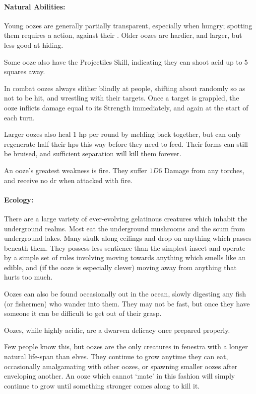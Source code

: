 \begin{multicols}{2}
\paragraph{Natural Abilities:} Young oozes are generally partially transparent, especially when hungry; spotting them requires a  action, against their .
Older oozes are hardier, and larger, but less good at hiding.

Some ooze also have the Projectiles Skill, indicating they can shoot acid up to 5 squares away.

In combat oozes always slither blindly at people, shifting about randomly so as not to be hit, and wrestling with their targets.
Once a target is grappled, the ooze inflicts damage equal to its Strength immediately, and again at the start of each turn.

Larger oozes also heal 1 \gls{hp} per round by melding back together, but can only regenerate half their \glspl{hp} this way before they need to feed.
Their forms can still be bruised, and sufficient separation will kill them forever.

An ooze's greatest weakness is fire.
They suffer $1D6$ Damage from any torches, and receive no \gls{dr} when attacked with fire.

\paragraph{Ecology:} There are a large variety of ever-evolving gelatinous creatures which inhabit the underground realms.
Most eat the underground mushrooms and the scum from underground lakes.
Many skulk along ceilings and drop on anything which passes beneath them.
They possess less sentience than the simplest insect and operate by a simple set of rules involving moving towards anything which smells like an edible, and (if the ooze is especially clever) moving away from anything that hurts too much.

Oozes can also be found occasionally out in the ocean, slowly digesting any fish (or fishermen) who wander into them.
They may not be fast, but once they have someone it can be difficult to get out of their grasp.

Oozes, while highly acidic, are a dwarven delicacy once prepared properly.

Few people know this, but oozes are the only creatures in \gls{fenestra} with a longer natural life-span than elves.
They continue to grow anytime they can eat, occasionally amalgamating with other oozes, or spawning smaller oozes after enveloping another.
An ooze which cannot `mate' in this fashion will simply continue to grow until something stronger comes along to kill it.


\end{multicols}
